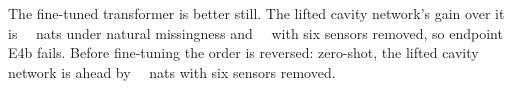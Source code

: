 The fine-tuned transformer is better still. The lifted cavity network's gain over it is \RbeijingeZerovspfn\
\RbeijingeZerovspfnci\ nats under natural missingness and \RbeijingeSixvspfn\ \RbeijingeSixvspfnci\ with six sensors
removed, so endpoint E4b fails. Before fine-tuning the order is reversed: zero-shot, the lifted cavity network is ahead
by \RbeijingeSixzsliftvspfnabs\ \RbeijingeSixzsliftvspfnci\ nats with six sensors removed.
